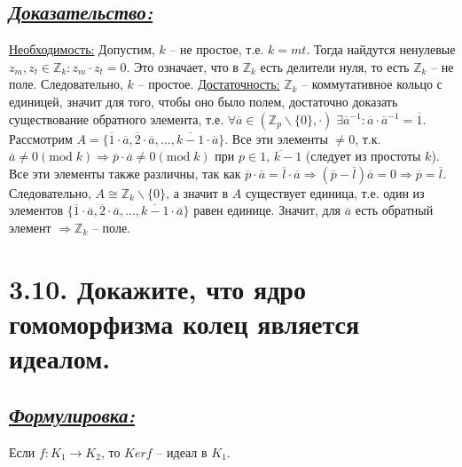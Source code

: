 \documentclass{article}
\begin{document}
\subsection*{\Large \underline{\textit{Доказательство: }}}
$ $\indent \underline{Необходимость:}
\newline  Допустим, $k$ -- не простое, т.е. $k = mt$. Тогда найдутся ненулевые $z_m, z_t \in \mathbb{Z}_k : z_m \cdot z_t = 0$. Это означает, что в $\mathbb{Z}_k$ есть делители нуля, то есть $\mathbb{Z}_k$ -- не поле. Следовательно, $k$ -- простое.
\newline \indent \underline{Достаточность:}
\newline $\mathbb{Z}_k$ -- коммутативное кольцо с единицей, значит для того, чтобы оно было полем, достаточно доказать существование обратного элемента, т.е. 
\newline $\forall \overline{a} \in (\mathbb{Z}_p \backslash \{0\}, \cdot) \; \exists \overline{a}^{-1} : \overline{a}\cdot\overline{a}^{-1} = \overline{1}$. Рассмотрим $A = \{\overline{1}\cdot \overline{a}, \overline{2}\cdot \overline{a}, ..., \overline{k-1}\cdot \overline{a}\}$. Все эти элементы $\ne 0$, т.к. $\overline{a} \ne 0 (\mbox{mod}\; k) \Rightarrow \overline{p}\cdot\overline{a} \ne 0 (\mbox{mod}\; k)$ при $p \in \overline{1,\, k-1}$ (следует из простоты $k$). Все эти элементы также различны, так как \newline $\overline{p}\cdot\overline{a} = \overline{l}\cdot\overline{a} \Rightarrow (\overline{p}-\overline{l})\overline{a} = 0 \Rightarrow \overline{p} = \overline{l}$. Следовательно, $A \cong \mathbb{Z}_k \backslash \{0\}$, а значит в $A$ существует единица, т.е. один из элементов $\{\overline{1}\cdot \overline{a}, \overline{2}\cdot \overline{a}, ..., \overline{k-1}\cdot \overline{a}\}$ равен единице. Значит, для $\overline{a}$ есть обратный элемент $\Rightarrow \mathbb{Z}_k$ -- поле. 

\section*{\LARGE 3.10. Докажите, что ядро гомоморфизма колец является идеалом. }
\subsection*{\Large \underline{\textit{Формулировка: }}}
Если $f : K_1 \rightarrow K_2$, то $Kerf$ -- идеал в $K_1$. 
\end{document}
